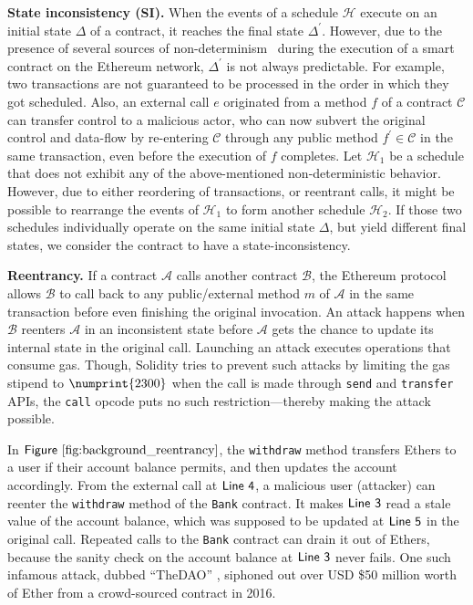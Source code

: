 \documentclass[conference, romanappendices]{tex/IEEEtran}
\theoremstyle{bfnote}
\newcommand{\solidity}{{\sc Solidity}\xspace}
\newcommand{\smart}{smart contract}
\newcommand{\ethereum}{Ethereum}
\newcommand{\ether}{{Ether}\xspace}
\newcommand{\si}{{state-inconsistency}\xspace}
\let\num\numprint
\newcommand{\Line}[1]{\ensuremath{\sf Line~ #1}}
\newcommand{\Fig}[1]{\ensuremath{\sf Figure~\ref{#1}}}
\begin{document}
\noindent
\textbf{State inconsistency (SI).}
When the events of a schedule $\mathcal{H}$ execute on an initial state $\Delta$ of a contract, it reaches the final state $\Delta^\prime$.
However, due to the presence of several sources of non-determinism~\cite{NPChecker} during the execution of a \smart{} on the \ethereum{} network, $\Delta^\prime$ is not always predictable.
For example,
two transactions are not guaranteed to be processed in the order in which they got scheduled.
Also, an external call $e$ originated from a method $f$ of a contract $\mathcal{C}$ can transfer control to a malicious actor, who can now subvert the original control and data-flow by re-entering $\mathcal{C}$ through any public method $f^\prime \in \mathcal{C}$ in the same transaction, even before the execution of $f$ completes.
Let $\mathcal{H}_1$ be a schedule that does not exhibit any of the above-mentioned non-deterministic behavior.
However, due to either reordering of transactions, or reentrant calls, it might be possible to rearrange the events of $\mathcal{H}_1$ to form another schedule $\mathcal{H}_2$.
If those two schedules individually operate on the same initial state $\Delta$, but yield different final states, we consider the contract to have a \si.



\noindent
\textbf{Reentrancy.}
If a contract $\mathcal{A}$ calls another contract $\mathcal{B}$, the \ethereum{} protocol allows $\mathcal{B}$ to call back to any public/external method $m$ of $\mathcal{A}$ in the same transaction before even finishing the original invocation.
An attack happens when $\mathcal{B}$ reenters $\mathcal{A}$ in an inconsistent state before $\mathcal{A}$ gets the chance to update its internal state in the original call.
Launching an attack executes operations that consume gas.
Though, \solidity tries to prevent such attacks by limiting the gas stipend to $\num{2300}$ when the call is made through \texttt{send} and \texttt{transfer} APIs, the \texttt{call} opcode puts no such restriction---thereby making the attack possible.

In \Fig{fig:background_reentrancy},
the \texttt{withdraw} method transfers Ethers to a user if their account balance permits, and then updates the account accordingly.
From the external call at \Line{4}, a malicious user (attacker) can reenter the \texttt{withdraw} method of the \texttt{Bank} contract.
It makes \Line{3} read a stale value of the account balance, which was supposed to be updated at \Line{5} in the original call.
Repeated calls to the \texttt{Bank} contract can drain it out of Ethers, because the sanity check on the account balance at \Line{3} never fails.
One such infamous attack, dubbed ``TheDAO'' \cite{dao-attack}, siphoned out over USD \$50 million worth of \ether from a crowd-sourced contract in 2016.
\end{document}
